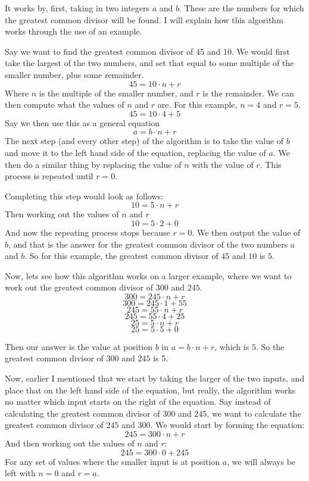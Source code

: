 \documentclass{article}
\begin{document}
It works by, first, taking in two integers $a$ and $b$. These are the numbers for which the greatest common divisor will be found. I will explain how this algorithm works through the use of an example.

Say we want to find the greatest common divisor of 45 and 10.
We would first take the largest of the two numbers, and set that equal to some multiple of the smaller number, plus some remainder.
$$45 = 10 \cdot n + r$$
Where $n$ is the multiple of the smaller number, and $r$ is the remainder.
We can then compute what the values of $n$ and $r$ are. For this example, $n = 4$ and $r = 5$.
$$45 = 10 \cdot 4 + 5$$
Say we then use this as a general equation
$$a = b \cdot n + r$$
The next step (and every other step) of the algorithm is to take the value of $b$ and move it to the left hand side of the equation, replacing the value of $a$. We then do a similar thing by replacing the value of $n$ with the value of $r$. This process is repeated until $r = 0$.

Completing this step would look as follows:
$$10 = 5 \cdot n + r$$
Then working out the values of $n$ and $r$
$$10 = 5 \cdot 2 + 0$$
And now the repeating process stops because $r=0$. We then output the value of $b$, and that is the answer for the greatest common divisor of the two numbers $a$ and $b$. So for this example, the greatest common divisor of $45$ and $10$ is $5$.

Now, lets see how this algorithm works on a larger example, where we want to work out the greatest common divisor of $300$ and $245$.
$$300 = 245 \cdot n + r$$
$$300 = 245 \cdot 1 + 55$$
$$245 = 55 \cdot n + r$$
$$245 = 55 \cdot 4 + 25$$
$$25 = 5 \cdot n + r$$
$$25 = 5 \cdot 5 + 0$$

Then our answer is the value at position $b$ in $a = b \cdot n + r$, which is $5$. So the greatest common divisor of $300$ and $245$ is 5.

Now, earlier I mentioned that we start by taking the larger of the two inputs, and place that on the left hand side of the equation, but really, the algorithm works no matter which input starts on the right of the equation. Say instead of calculating the greatest common divisor of $300$ and $245$, we want to calculate the greatest common divisor of $245$ and $300$. We would start by forming the equation:
$$245 = 300 \cdot n + r$$
And then working out the values of $n$ and $r$:
$$245 = 300 \cdot 0 + 245$$
For any set of values where the smaller input is at position $a$, we will always be left with $n = 0$ and $r = a$.
\end{document}
